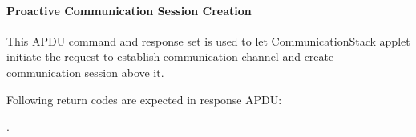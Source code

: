 \documentclass[]{llncs}
\begin{document}
\begin{table}[!htbp]
\caption{Verify PIN response APDU}
\label{verify-response-apdu}
\end{table}

\paragraph{Proactive Communication Session Creation}
This APDU command and response set is used to let  CommunicationStack applet initiate the request to establish communication channel and create communication  session above  it.

\begin{table}[!htbp]
\caption{Trigger Session command APDU}
\label{trigger-session-apdu}
\end{table}

Following return codes are expected in response APDU:

.\begin{table}[!htbp]
\caption{Trigger Session Return Code}
\label{trigger-session-response-apdu}
\end{table}
\end{document}
